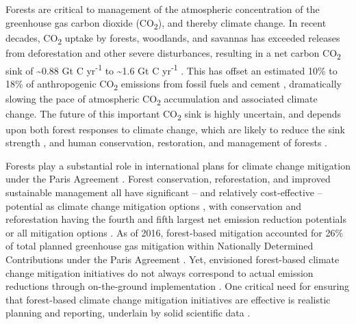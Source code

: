 \documentclass[, manuscript]{copernicus}
\begin{document}
Forests are critical to management of the atmospheric concentration of
the greenhouse gas carbon dioxide (CO\textsubscript{2}), and thereby
climate change. In recent decades, CO\textsubscript{2} uptake by
forests, woodlands, and savannas has exceeded releases from
deforestation and other severe disturbances, resulting in a net carbon
CO\textsubscript{2} sink of \textasciitilde0.88 Gt C
yr\textsuperscript{-1} \citep[all biomes with trees,][]{xu_changes_2021}
to \textasciitilde1.6 Gt C yr\textsuperscript{-1} \citep[forests
only,][]{harris_global_2021}. This has offset an estimated 10\% to 18\%
of anthropogenic CO\textsubscript{2} emissions from fossil fuels and
cement \citep{xu_changes_2021, harris_global_2021}, dramatically slowing
the pace of atmospheric CO\textsubscript{2} accumulation and associated
climate change. The future of this important CO\textsubscript{2} sink is
highly uncertain, and depends upon both forest responses to climate
change, which are likely to reduce the sink strength
\citep{mcdowell_pervasive_2020, hammond_global_2022}, and human
conservation, restoration, and management of forests
\citep{ipcc_climate_2019, ipcc_climate_2022}.

Forests play a substantial role in international plans for climate
change mitigation under the Paris Agreement
\citep{unfccc_adoption_2015}. Forest conservation, reforestation, and
improved sustainable management all have significant -- and relatively
cost-effective -- potential as climate change mitigation options
\citep{roe_landbased_2021}, with conservation and reforestation having
the fourth and fifth largest net emission reduction potentials or all
mitigation options \citep{ipcc_summary_2022}. As of 2016, forest-based
mitigation accounted for 26\% of total planned greenhouse gas mitigation
within Nationally Determined Contributions under the Paris Agreement
\citep{grassi_key_2017}. Yet, envisioned forest-based climate change
mitigation initiatives do not always correspond to actual emission
reductions through on-the-ground implementation
\citep[e.g.,][]{badgley_systematic_2022}. One critical need for ensuring
that forest-based climate change mitigation initiatives are effective is
realistic planning and reporting, underlain by solid scientific data
\citep{anderson-teixeira_effective_2022, deng_comparing_2021}.
\end{document}
